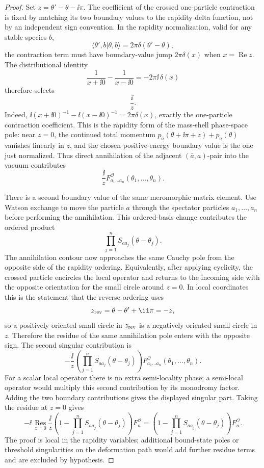 \begin{proof}
Set \(z=\theta'-\theta-\ii\pi\).  The coefficient of the crossed
one-particle contraction is fixed by matching its two boundary values to the
rapidity delta function, not by an independent sign convention.  In the
rapidity normalization, valid for any stable species \(b\),
\[
  \langle \theta',b|\theta,b\rangle=2\pi\delta(\theta'-\theta),
\]
the contraction term must have boundary-value jump \(2\pi\delta(x)\) when
\(x=\operatorname{Re}z\).  The distributional identity
\[
  \frac{1}{x+\ii0}-\frac{1}{x-\ii0}
  =
  -2\pi\ii\,\delta(x)
\]
therefore selects
\[
  \frac{\ii}{z}.
\]
Indeed,
\(\ii(x+\ii0)^{-1}-\ii(x-\ii0)^{-1}=2\pi\delta(x)\), exactly the
one-particle contraction coefficient.  This is the rapidity form of the
mass-shell phase-space pole: near \(z=0\), the continued total momentum
\(p_{\bar a}(\theta+\ii\pi+z)+p_a(\theta)\) vanishes linearly in \(z\), and the
chosen positive-energy boundary value is the one just normalized.  Thus direct
annihilation of the adjacent \((\bar a,a)\)-pair into the vacuum contributes
\[
  \frac{\ii}{z}
  F^{\mathcal O}_{a_1\ldots a_n}(\theta_1,\ldots,\theta_n).
  \tag{direct}
\]

There is a second boundary value of the same meromorphic matrix element.
Use Watson exchange to move the particle \(a\) through the spectator
particles \(a_1,\ldots,a_n\) before performing the annihilation.  This
ordered-basis change contributes the ordered product
\[
  \prod_{j=1}^n S_{a a_j}(\theta-\theta_j).
\]
The annihilation contour now approaches the same Cauchy pole from the
opposite side of the rapidity ordering.  Equivalently, after applying
cyclicity, the crossed particle encircles the local operator and returns to
the incoming side with the opposite orientation for the small circle around
\(z=0\).  In local coordinates this is the statement that the reverse
ordering uses
\[
  z_{\rm rev}
  =
  \theta-\theta'+\ii\pi
  =
  -z,
\]
so a positively oriented small circle in \(z_{\rm rev}\) is a negatively
oriented small circle in \(z\).  Therefore the residue of the same
annihilation pole enters with the opposite sign.  The second singular
contribution is
\[
  -\frac{\ii}{z}
  \left(\prod_{j=1}^n S_{a a_j}(\theta-\theta_j)\right)
  F^{\mathcal O}_{a_1\ldots a_n}(\theta_1,\ldots,\theta_n).
  \tag{scattered}
  \]
For a scalar local operator there is no extra semi-locality phase; a
semi-local operator would multiply this second contribution by its monodromy
factor.  Adding the two boundary contributions gives the displayed singular
part.  Taking the residue at \(z=0\) gives
\[
  -\ii\,\operatorname*{Res}_{z=0}
  \frac{\ii}{z}
  \left(1-\prod_{j=1}^nS_{a a_j}(\theta-\theta_j)\right)
  F_n^{\mathcal O}
  =
  \left(1-\prod_{j=1}^nS_{a a_j}(\theta-\theta_j)\right)
  F_n^{\mathcal O}.
\]
The proof is local in the rapidity variables; additional bound-state poles or
threshold singularities on the deformation path would add further residue
terms and are excluded by hypothesis.
\end{proof}

